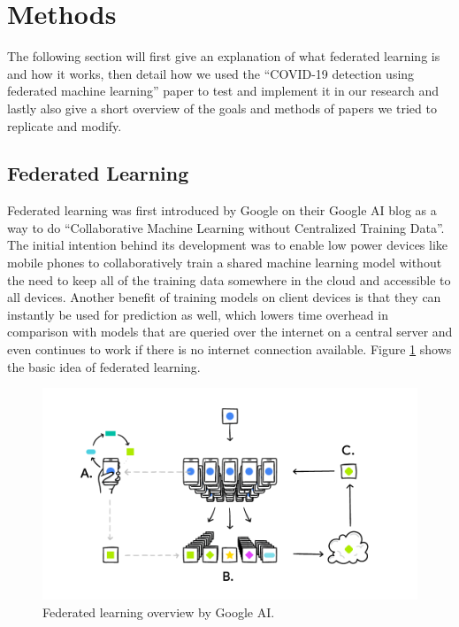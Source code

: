 \section{Methods}
The following section will first give an explanation of what federated learning is and how it works, then detail how we used the \enquote{COVID-19 detection using federated machine learning} paper\cite{federated_machine_learning} to test and implement it in our research and lastly also give a short overview of the goals and methods of papers we tried to replicate and modify.

\subsection{Federated Learning}\label{subsec:methods_federated_learning}
Federated learning was first introduced by Google on their Google AI blog as a way to do \enquote{Collaborative Machine Learning without Centralized Training Data}\cite{google_ai_federated_learning}. The initial intention behind its development was to enable low power devices like mobile phones to collaboratively train a shared machine learning model without the need to keep all of the training data somewhere in the cloud and accessible to all devices. Another benefit of training models on client devices is that they can instantly be used for prediction as well, which lowers time overhead in comparison with models that are queried over the internet on a central server and even continues to work if there is no internet connection available.
Figure \ref{fig:google_ai_fl} shows the basic idea of federated learning. 

\begin{figure}[htbp]
    \centering
    \includegraphics[width=1.0\linewidth]{imgs/FederatedLearning_googleai.png}
    \caption{Federated learning overview by Google AI.\cite{google_ai_federated_learning}}
    \label{fig:google_ai_fl}
\end{figure}

